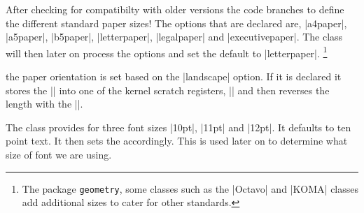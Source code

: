 \begin{teX}
\newcommand\@ptsize{}
\newif\if@restonecol
\newif\if@titlepage \@titlepagetrue
\newif\if@openright
\newif\if@mainmatter \@mainmattertrue
\end{teX}


 After checking for compatibilty with older versions the code branches to define the different standard paper sizes! The options that are declared are, |a4paper|, |a5paper|, |b5paper|, |letterpaper|, |legalpaper| and  |executivepaper|. The class will then later on process the options and set the default to |letterpaper|. \footnote{The package \texttt{geometry}, some classes such as the |Octavo| and |KOMA| classes add additional sizes to cater for other standards.}

\begin{teX}
\if@compatibility\else
{}
   {\setlength\paperheight {297mm}%
    \setlength\paperwidth  {210mm}}
   {\setlength\paperheight {210mm}%
    \setlength\paperwidth  {148mm}}
   {\setlength\paperheight {250mm}%
    \setlength\paperwidth  {176mm}}
   {\setlength\paperheight {11in}%
    \setlength\paperwidth  {8.5in}}
   {\setlength\paperheight {14in}%
    \setlength\paperwidth  {8.5in}}
   {\setlength\paperheight {10.5in}%
    \setlength\paperwidth  {7.25in}}
\end{teX}

\begin{multicols}{2}
 the paper orientation is set based on the |landscape| option. If it is declared it stores the |\paperheight| into one of the \latex kernel scratch registers, |\@tempdima| and then reverses the length with the |\paperwidth|.
\end{multicols}


\begin{teX}
   {\setlength\@tempdima   {\paperheight}%
    \setlength\paperheight {\paperwidth}%
    \setlength\paperwidth  {\@tempdima}}
\fi
\end{teX}


 The class provides for three font sizes |10pt|, |11pt| and |12pt|. It defaults to ten point text. It then
sets the  accordingly. This is used later on to determine what size of font we are using.


